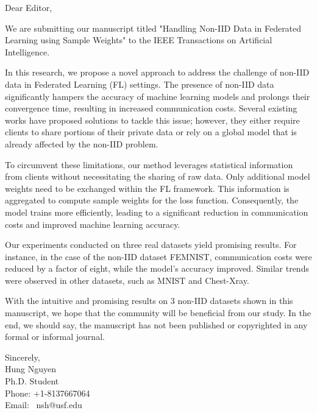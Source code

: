 \documentclass{letter}
\begin{document}
	
	\begin{letter}{}
		\opening{Dear Editor,}
		
We are submitting our manuscript titled "Handling Non-IID Data in Federated Learning using Sample Weights" to the IEEE Transactions on Artificial Intelligence.

In this research, we propose a novel approach to address the challenge of non-IID data in Federated Learning (FL) settings. The presence of non-IID data significantly hampers the accuracy of machine learning models and prolongs their convergence time, resulting in increased communication costs. Several existing works have proposed solutions to tackle this issue; however, they either require clients to share portions of their private data or rely on a global model that is already affected by the non-IID problem.

To circumvent these limitations, our method leverages statistical information from clients without necessitating the sharing of raw data. Only additional model weights need to be exchanged within the FL framework. This information is aggregated to compute sample weights for the loss function. Consequently, the model trains more efficiently, leading to a significant reduction in communication costs and improved machine learning accuracy.

Our experiments conducted on three real datasets yield promising results. For instance, in the case of the non-IID dataset FEMNIST, communication costs were reduced by a factor of eight, while the model's accuracy improved. Similar trends were observed in other datasets, such as MNIST and Chest-Xray.

With the intuitive and promising results on 3 non-IID datasets shown in this manuscript, we hope that the community will be beneficial from our study. In the end, we should say, the manuscript has not been published or copyrighted in any formal or informal journal.


Sincerely,\\
Hung Nguyen\\
Ph.D. Student\\
Phone: +1-8137667064\\
Email:  nsh@usf.edu\\

\end{letter}
\end{document}
